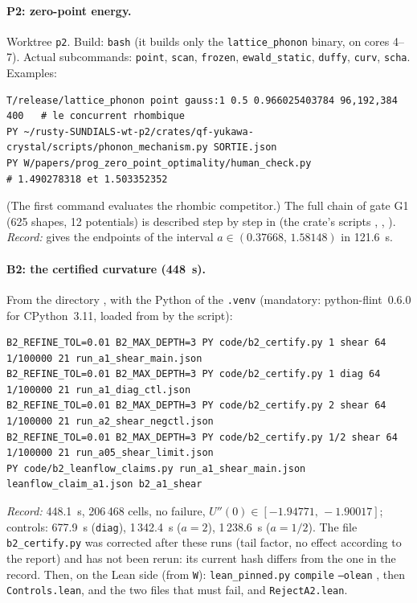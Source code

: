 \paragraph{P2: zero-point energy.} Worktree \texttt{p2}. Build:
\texttt{bash}  (it builds only the \texttt{lattice\_phonon} binary, on
cores 4--7). Actual subcommands: \texttt{point}, \texttt{scan}, \texttt{frozen}, \texttt{ewald\_static},
\texttt{duffy}, \texttt{curv}, \texttt{scha}. Examples:
\begin{lstlisting}[style=appC,language={}]
T/release/lattice_phonon point gauss:1 0.5 0.966025403784 96,192,384 400   # le concurrent rhombique
PY ~/rusty-SUNDIALS-wt-p2/crates/qf-yukawa-crystal/scripts/phonon_mechanism.py SORTIE.json
PY W/papers/prog_zero_point_optimality/human_check.py                       # 1.490278318 et 1.503352352
\end{lstlisting}
(The first command evaluates the rhombic competitor.) The full chain of gate G1 (625 shapes, 12 potentials) is described
step by step in  (the crate's scripts ,
, ). \emph{Record:}  gives the
endpoints of the interval $a\in(0.37668,\,1.58148)$ in 121.6~s.

\paragraph{B2: the certified curvature (448~s).} From the directory , with the
Python of the \texttt{.venv} (mandatory: python-flint~0.6.0 for CPython~3.11, loaded from 
by the script):
\begin{lstlisting}[style=appC,language={}]
B2_REFINE_TOL=0.01 B2_MAX_DEPTH=3 PY code/b2_certify.py 1 shear 64 1/100000 21 run_a1_shear_main.json
B2_REFINE_TOL=0.01 B2_MAX_DEPTH=3 PY code/b2_certify.py 1 diag 64 1/100000 21 run_a1_diag_ctl.json
B2_REFINE_TOL=0.01 B2_MAX_DEPTH=3 PY code/b2_certify.py 2 shear 64 1/100000 21 run_a2_shear_negctl.json
B2_REFINE_TOL=0.01 B2_MAX_DEPTH=3 PY code/b2_certify.py 1/2 shear 64 1/100000 21 run_a05_shear_limit.json
PY code/b2_leanflow_claims.py run_a1_shear_main.json leanflow_claim_a1.json b2_a1_shear
\end{lstlisting}
\emph{Record:} 448.1~s, 206\,468 cells, no failure, $U''(0)\in[-1.94771,\,-1.90017]$; controls: 677.9~s
(\texttt{diag}), 1\,342.4~s ($a=2$), 1\,238.6~s ($a=1/2$). The file \texttt{b2\_certify.py} was corrected after these
runs (tail factor, no effect according to the report) and has not been rerun: its current hash differs from the one in
the record. Then, on the Lean side (from \texttt{W}):
\texttt{lean\_pinned.py} \texttt{compile}  \texttt{--olean} ,
then \texttt{Controls.lean}, and the two files that must fail,  and
\texttt{RejectA2.lean}.

